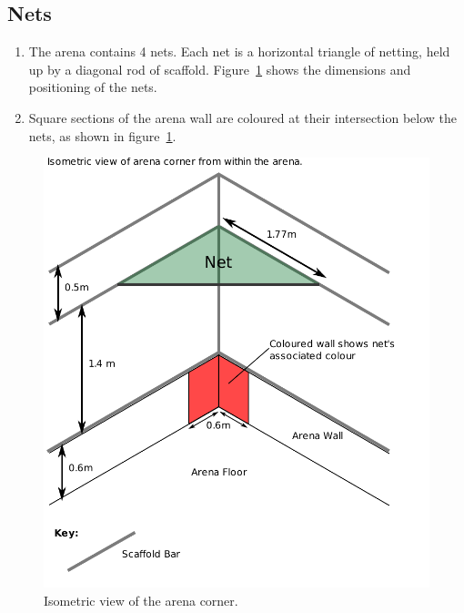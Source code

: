 \subsection{Nets}
\begin{enumerate}
\item The arena contains 4 nets.  Each net is a horizontal triangle of netting, held up by a diagonal rod of scaffold. Figure~\ref{fig:nets} shows the dimensions and positioning of the nets.
\item Square sections of the arena wall are coloured at their intersection below the nets, as shown in figure~\ref{fig:nets}.
\end{enumerate}

\begin{figure}
\begin{center}
\includegraphics[keepaspectratio, scale =1]{./images/net.pdf}
\caption{\label{fig:nets}Isometric view of the arena corner.}
\end{center}
\end{figure}

